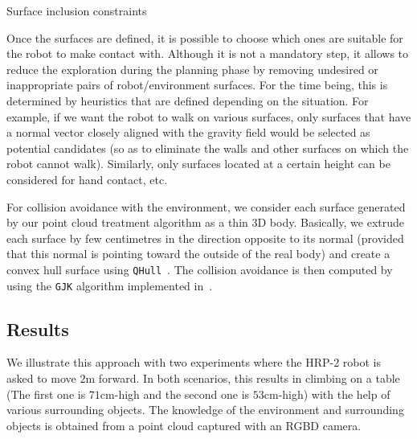 \begin{algorithm}
\caption{Surface inclusion constraints}
\label{alg:surf_inclusion}
\begin{algorithmic}
\EndFor{}
\EndFor{}
\end{algorithmic}
\end{algorithm}

Once the surfaces are defined, it is possible to choose which ones are suitable for the robot to make contact with.
Although it is not a mandatory step, it allows to reduce the exploration during the planning phase by removing undesired or inappropriate pairs of robot/environment surfaces.
For the time being, this is determined by heuristics that are defined depending on the situation.
For example, if we want the robot to walk on various surfaces, only surfaces that have a normal vector closely aligned with the gravity field would be selected as potential candidates (so as to eliminate the walls and other surfaces on which the robot cannot walk).
Similarly, only surfaces located at a certain height can be considered for hand contact, etc.

For collision avoidance with the environment, we consider each surface generated by our point cloud treatment algorithm as a thin 3D body.
Basically, we extrude each surface by few centimetres in the direction opposite to its normal (provided that this normal is pointing toward the outside of the real body) and create a convex hull surface using {\tt QHull}~\cite{qhull:acm:1996}.
The collision avoidance is then computed by using the {\tt GJK} algorithm implemented in~\cite{benallegue:icra:2009}.

\subsection{Results}
\label{sub:results_pcl_plannif}

We illustrate this approach with two experiments where the HRP-2 robot is asked to move $2$m forward.
In both scenarios, this results in climbing on a table (The first one is $71$cm-high and the second one is $53$cm-high) with the help of various surrounding objects.
The knowledge of the environment and surrounding objects is obtained from a point cloud captured with an RGBD camera.

